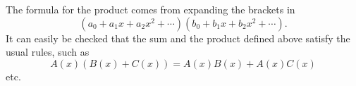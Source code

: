 

\setcounter{section}{2}
\setcounter{subsection}{2}
\setcounter{dfn}{1}

The formula for the product comes from expanding the brackets in
\[
(a_0 + a_1 x + a_2 x^2 + \cdots)(b_0 + b_1 x + b_2 x^2 + \cdots).
\]
It can easily be checked that the sum and the product defined above satisfy the usual rules, such as
\[
A(x)(B(x) + C(x)) = A(x)B(x) + A(x)C(x)
\]
etc.



